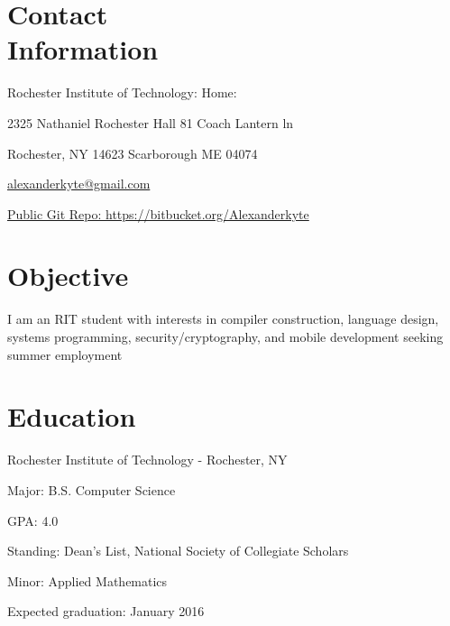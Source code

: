 \documentclass[letter,margin,line]{resume}
\begin{document}
\begin{resume}
\section{\mysidestyle Contact \\ Information} \vspace{2mm}
	\begin{asparablank}
		\item Rochester Institute of Technology: \hfill Home: \hfill
		\item 2325 Nathaniel Rochester Hall \hfill 81 Coach Lantern ln \hfill
		\item Rochester, NY 14623 \hfill Scarborough ME 04074 \hfill
		\\		
		\item\href{mailto:alexanderkyte@gmail.com}{alexanderkyte@gmail.com} \hfill
		\item\href{https://bitbucket.org/Alexanderkyte}{Public Git Repo: https://bitbucket.org/Alexanderkyte} 
	\end{asparablank}

\section{\mysidestyle Objective} \vspace{2mm}
	\begin{asparablank} 
	\item I am an RIT student with interests in compiler construction, language design, systems programming, security/cryptography, and mobile development seeking summer employment 
	 \end{asparablank}

\section{\mysidestyle Education}
	\begin{compactdesc}
		\item[Rochester Institute of Technology] - Rochester, NY 
		\begin{compactitem} { \small
			\item Major: B.S. Computer Science
			\item GPA: 4.0
			\item Standing: Dean's List, National Society of Collegiate Scholars
			\item Minor: Applied Mathematics
			\item Expected graduation: January 2016
		} \end{compactitem}
	\end{compactdesc}


\end{resume}
\end{document}
